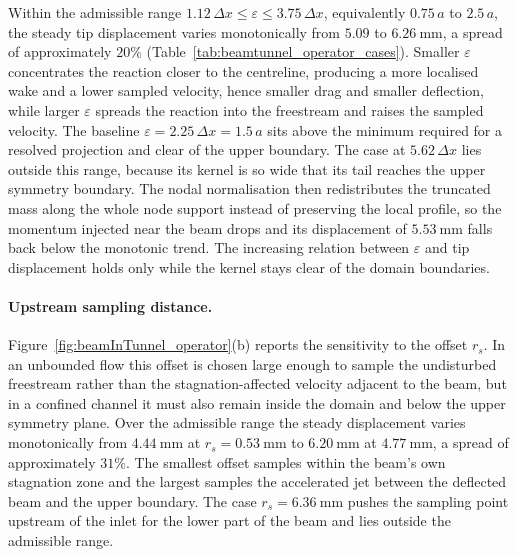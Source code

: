 \noindent
Within the admissible range $1.12\,\Delta x \le \varepsilon \le 3.75\,\Delta x$, equivalently $0.75\,a$ to $2.5\,a$, the steady tip displacement varies monotonically from $5.09$ to $6.26~\mathrm{mm}$, a spread of approximately $20\%$ (Table~\ref{tab:beamtunnel_operator_cases}). Smaller $\varepsilon$ concentrates the reaction closer to the centreline, producing a more localised wake and a lower sampled velocity, hence smaller drag and smaller deflection, while larger $\varepsilon$ spreads the reaction into the freestream and raises the sampled velocity. The baseline $\varepsilon = 2.25\,\Delta x = 1.5\,a$ sits above the minimum required for a resolved projection and clear of the upper boundary. The case at $5.62\,\Delta x$ lies outside this range, because its kernel is so wide that its tail reaches the upper symmetry boundary. The nodal normalisation then redistributes the truncated mass along the whole node support instead of preserving the local profile, so the momentum injected near the beam drops and its displacement of $5.53~\mathrm{mm}$ falls back below the monotonic trend. The increasing relation between $\varepsilon$ and tip displacement holds only while the kernel stays clear of the domain boundaries.

\paragraph{Upstream sampling distance.}
Figure~\ref{fig:beamInTunnel_operator}(b) reports the sensitivity to the offset $r_s$. In an unbounded flow this offset is chosen large enough to sample the undisturbed freestream rather than the stagnation-affected velocity adjacent to the beam, but in a confined channel it must also remain inside the domain and below the upper symmetry plane. Over the admissible range the steady displacement varies monotonically from $4.44~\mathrm{mm}$ at $r_s = 0.53~\mathrm{mm}$ to $6.20~\mathrm{mm}$ at $4.77~\mathrm{mm}$, a spread of approximately $31\%$. The smallest offset samples within the beam's own stagnation zone and the largest samples the accelerated jet between the deflected beam and the upper boundary. The case $r_s = 6.36~\mathrm{mm}$ pushes the sampling point upstream of the inlet for the lower part of the beam and lies outside the admissible range.

